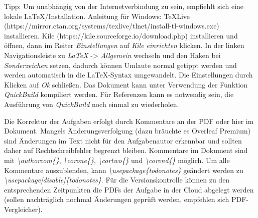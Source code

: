 \documentclass[./main.tex]{subfiles}
\begin{document}
\bigskip
Tipp: Um unabh\"angig von der Internetverbindung zu sein, empfiehlt sich eine lokale \LaTeX\-/Installation. Anleitung f\"ur Windows: TeXLive (https://mirror.ctan.org/systems/texlive/tlnet/install-tl-windows.exe) installieren. Kile (https://kile.sourceforge.io/download.php) installieren und \"offnen, dann im Reiter \textit{Einstellungen} auf \textit{Kile einrichten} klicken. In der linken Navigationsleiste zu \textit{LaTeX} -> \textit{Allgemein} wechseln und den Haken bei \textit{Sonderzeichen} setzen, dadurch k\"onnen Umlaute normal getippt werden und werden automatisch in die \LaTeX-Syntax umgewandelt. Die Einstellungen durch Klicken auf \textit{Ok} schlie\ss{}en. Das Dokument kann unter Verwendung der Funktion \textit{QuickBuild} kompiliert werden. F\"ur Referenzen kann es notwendig sein, die Ausf\"uhrung von \textit{QuickBuild} noch einmal zu wiederholen.

\bigskip
Die Korrektur der Aufgaben erfolgt durch Kommentare an der PDF oder hier im Dokument. Mangels \"Anderungsverfolgung (dazu br\"auchte es Overleaf Premium) sind \"Anderungen im Text nicht f\"ur den Aufgabenautor erkennbar und sollten daher auf Rechtschreibfehler begrenzt bleiben. Kommentare im Dokument sind mit \textit{\hypertarget{authorcom}{\textbackslash authorcom\{\}}}, \textit{\hypertarget{corone}{\textbackslash corone\{\}}}, \textit{\hypertarget{cortwo}{\textbackslash cortwo\{\}}} und \textit{\hypertarget{corend}{\textbackslash corend\{\}}} m\"oglich. Um alle Kommentare auszublenden, kann \textit{\textbackslash usepackage\{todonotes\}} ge\"andert werden zu \textit{\textbackslash usepackage[disable]\{todonotes\}}. F\"ur die Versionskontrolle k\"onnen zu den entsprechenden Zeitpunkten die PDFs der Aufgabe in der Cloud abgelegt werden (sollen nachtr\"aglich nochmal \"Anderungen gepr\"uft werden, empfehlen sich PDF-Vergleicher). 
\end{document}
